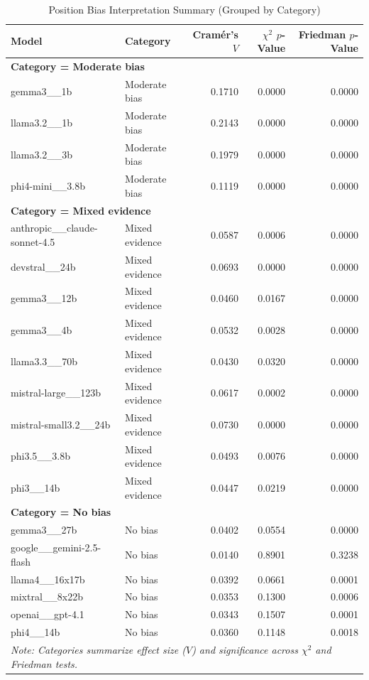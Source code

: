\begin{table}[htbp]
\centering
\caption{Position Bias Interpretation Summary (Grouped by Category)}
\label{tab:position_interpretation_mirror}
\begin{tabular}{l l r r r}
\toprule
Model & Category & Cram\'er's $V$ & $\chi^2$ $p$-Value & Friedman $p$-Value \\
\midrule
\multicolumn{5}{l}{\textbf{Category = Moderate bias}} \\
\midrule
gemma3\_\_1b                        & Moderate bias & 0.1710 & 0.0000 & 0.0000 \\
llama3.2\_\_1b                      & Moderate bias & 0.2143 & 0.0000 & 0.0000 \\
llama3.2\_\_3b                      & Moderate bias & 0.1979 & 0.0000 & 0.0000 \\
phi4-mini\_\_3.8b                   & Moderate bias & 0.1119 & 0.0000 & 0.0000 \\
\midrule
\multicolumn{5}{l}{\textbf{Category = Mixed evidence}} \\
\midrule
anthropic\_\_claude-sonnet-4.5      & Mixed evidence & 0.0587 & 0.0006 & 0.0000 \\
devstral\_\_24b                     & Mixed evidence & 0.0693 & 0.0000 & 0.0000 \\
gemma3\_\_12b                       & Mixed evidence & 0.0460 & 0.0167 & 0.0000 \\
gemma3\_\_4b                        & Mixed evidence & 0.0532 & 0.0028 & 0.0000 \\
llama3.3\_\_70b                     & Mixed evidence & 0.0430 & 0.0320 & 0.0000 \\
mistral-large\_\_123b               & Mixed evidence & 0.0617 & 0.0002 & 0.0000 \\
mistral-small3.2\_\_24b             & Mixed evidence & 0.0730 & 0.0000 & 0.0000 \\
phi3.5\_\_3.8b                      & Mixed evidence & 0.0493 & 0.0076 & 0.0000 \\
phi3\_\_14b                         & Mixed evidence & 0.0447 & 0.0219 & 0.0000 \\
\midrule
\multicolumn{5}{l}{\textbf{Category = No bias}} \\
\midrule
gemma3\_\_27b                       & No bias & 0.0402 & 0.0554 & 0.0000 \\
google\_\_gemini-2.5-flash          & No bias & 0.0140 & 0.8901 & 0.3238 \\
llama4\_\_16x17b                    & No bias & 0.0392 & 0.0661 & 0.0001 \\
mixtral\_\_8x22b                    & No bias & 0.0353 & 0.1300 & 0.0006 \\
openai\_\_gpt-4.1                   & No bias & 0.0343 & 0.1507 & 0.0001 \\
phi4\_\_14b                         & No bias & 0.0360 & 0.1148 & 0.0018 \\
\midrule
\multicolumn{5}{l}{\footnotesize \textit{Note: Categories summarize effect size ($V$) and significance across $\chi^2$ and Friedman tests.}} \\
\bottomrule
\end{tabular}
\end{table}

